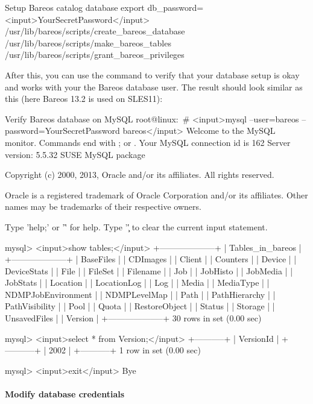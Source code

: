\begin{commands}{Setup Bareos catalog database}
export db_password=<input>YourSecretPassword</input>
/usr/lib/bareos/scripts/create_bareos_database
/usr/lib/bareos/scripts/make_bareos_tables
/usr/lib/bareos/scripts/grant_bareos_privileges
\end{commands}

After this, you can use the  command to verify that your database setup is okay
and works with your the Bareos database user.
The result should look similar as this (here Bareos 13.2 is used on SLES11):

\begin{commands}{Verify Bareos database on MySQL}
root@linux:~# <input>mysql --user=bareos --password=YourSecretPassword bareos</input>
Welcome to the MySQL monitor.  Commands end with ; or \g.
Your MySQL connection id is 162
Server version: 5.5.32 SUSE MySQL package

Copyright (c) 2000, 2013, Oracle and/or its affiliates. All rights reserved.

Oracle is a registered trademark of Oracle Corporation and/or its
affiliates. Other names may be trademarks of their respective
owners.

Type 'help;' or '\h' for help. Type '\c' to clear the current input statement.

mysql> <input>show tables;</input>
+--------------------+
| Tables_in_bareos   |
+--------------------+
| BaseFiles          |
| CDImages           |
| Client             |
| Counters           |
| Device             |
| DeviceStats        |
| File               |
| FileSet            |
| Filename           |
| Job                |
| JobHisto           |
| JobMedia           |
| JobStats           |
| Location           |
| LocationLog        |
| Log                |
| Media              |
| MediaType          |
| NDMPJobEnvironment |
| NDMPLevelMap       |
| Path               |
| PathHierarchy      |
| PathVisibility     |
| Pool               |
| Quota              |
| RestoreObject      |
| Status             |
| Storage            |
| UnsavedFiles       |
| Version            |
+--------------------+
30 rows in set (0.00 sec)

mysql> <input>select * from Version;</input>
+-----------+
| VersionId |
+-----------+
|      2002 |
+-----------+
1 row in set (0.00 sec)

mysql> <input>exit</input>
Bye
\end{commands}


\paragraph{Modify database credentials}

